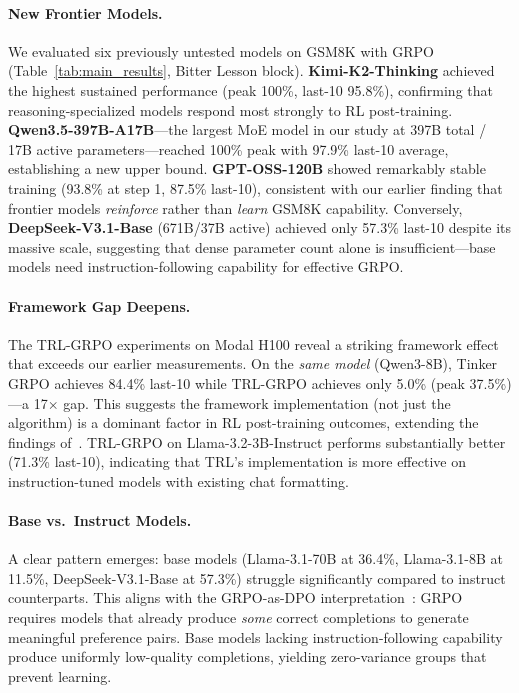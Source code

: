 \documentclass{article}
\begin{document}
\paragraph{New Frontier Models.}
We evaluated six previously untested models on GSM8K with GRPO (Table~\ref{tab:main_results}, Bitter Lesson block).
\textbf{Kimi-K2-Thinking} achieved the highest sustained performance (peak 100\%, last-10 95.8\%), confirming that reasoning-specialized models respond most strongly to RL post-training.
\textbf{Qwen3.5-397B-A17B}---the largest MoE model in our study at 397B total / 17B active parameters---reached 100\% peak with 97.9\% last-10 average, establishing a new upper bound.
\textbf{GPT-OSS-120B} showed remarkably stable training (93.8\% at step 1, 87.5\% last-10), consistent with our earlier finding that frontier models \emph{reinforce} rather than \emph{learn} GSM8K capability.
Conversely, \textbf{DeepSeek-V3.1-Base} (671B/37B active) achieved only 57.3\% last-10 despite its massive scale, suggesting that dense parameter count alone is insufficient---base models need instruction-following capability for effective GRPO.

\paragraph{Framework Gap Deepens.}
The TRL-GRPO experiments on Modal H100 reveal a striking framework effect that exceeds our earlier measurements.
On the \emph{same model} (Qwen3-8B), Tinker GRPO achieves 84.4\% last-10 while TRL-GRPO achieves only 5.0\% (peak 37.5\%)---a 17$\times$ gap.
This suggests the framework implementation (not just the algorithm) is a dominant factor in RL post-training outcomes, extending the findings of~\citet{henderson2018deep}.
TRL-GRPO on Llama-3.2-3B-Instruct performs substantially better (71.3\% last-10), indicating that TRL's implementation is more effective on instruction-tuned models with existing chat formatting.

\paragraph{Base vs.~Instruct Models.}
A clear pattern emerges: base models (Llama-3.1-70B at 36.4\%, Llama-3.1-8B at 11.5\%, DeepSeek-V3.1-Base at 57.3\%) struggle significantly compared to instruct counterparts.
This aligns with the GRPO-as-DPO interpretation~\cite{wu2025grpo_dpo}: GRPO requires models that already produce \emph{some} correct completions to generate meaningful preference pairs.
Base models lacking instruction-following capability produce uniformly low-quality completions, yielding zero-variance groups that prevent learning.
\end{document}
